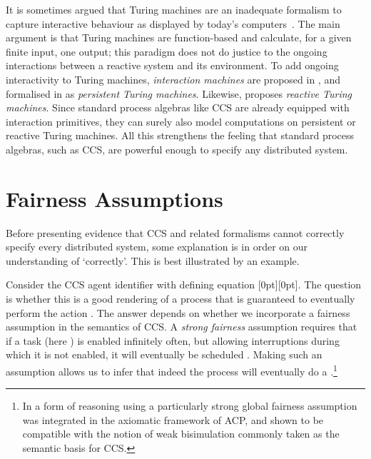 \documentclass[smallcondensed]{svjour3}
\newcommand{\plat}[1]{\raisebox{0pt}[0pt][0pt]{#1}}  \def\precond#1{{\vphantom{#1}}^\bullet #1}
\newcounter {part}
\begin{document}
It is sometimes argued that Turing machines are an inadequate formalism to capture interactive
behaviour as displayed by today's computers~\cite{Wegner97,LW01}.
The main
argument is that Turing machines are function-based and 
calculate, for a given finite input, one output;
this paradigm does not do justice to the ongoing interactions between a reactive system and its
environment.
To add ongoing interactivity to Turing machines, \emph{interaction machines} are proposed in
\cite{Wegner97}, and formalised in \cite{GSAS04} as \emph{persistent Turing machines}. Likewise,
\cite{BLT11} proposes \emph{reactive Turing machines}.
Since standard process algebras like CCS are already equipped with interaction primitives,
they can surely also model computations on persistent or reactive Turing machines.
All this strengthens the feeling
that standard process algebras, such as CCS,
are powerful enough to specify any distributed system.

\section{Fairness Assumptions}{\label{sec:fairness}}


Before presenting evidence that CCS and related formalisms cannot correctly specify every distributed system,
some explanation is in order on our understanding of `correctly'. This is best illustrated by an example.
\advance\textheight 1pt

Consider the CCS agent identifier  with defining equation \plat{}.
The question is whether this is a good rendering of a process that is guaranteed to eventually
perform the action . The answer depends on whether we incorporate a fairness assumption in the
semantics of CCS\@. A \emph{strong fairness} assumption requires that if a task (here ) is enabled
infinitely often, but allowing interruptions during which it is not enabled, it will eventually be
scheduled \cite{GPSS80,LPS81}.
Making such an assumption allows us to infer that indeed the process  will eventually do a .\footnote{In \cite{BBK87a} a form of reasoning using a particularly strong global fairness assumption
was integrated in the axiomatic framework of ACP, and shown to be compatible with the notion of
weak bisimulation commonly taken as the semantic basis for CCS\@.}
\end{document}
